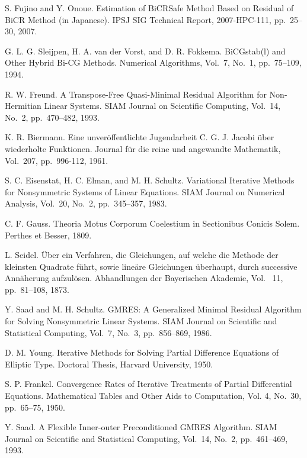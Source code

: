 \documentclass[a4paper]{jarticle}
\begin{document}
{\begin{thebibliography}{10}
S. Fujino and Y. Onoue.
\newblock Estimation of BiCRSafe Method Based on Residual of BiCR Method (in Japanese).
\newblock IPSJ SIG Technical Report, 2007-HPC-111, pp.\ 25--30, 2007.

G. L. G. Sleijpen, H. A. van der Vorst, and D. R. Fokkema.
\newblock BiCGstab(l) and Other Hybrid Bi-CG Methods.
\newblock Numerical Algorithms, Vol.~7, No.~1, pp.\ 75--109, 1994.

R. W. Freund.
\newblock A Transpose-Free Quasi-Minimal Residual Algorithm for
	Non-Hermitian Linear Systems.
\newblock SIAM Journal on Scientific Computing, Vol.~14, No.~2, pp.\ 470--482, 1993.

K. R. Biermann.
\newblock Eine unver\"offentlichte Jugendarbeit C. G. J. Jacobi \"uber
	wiederholte Funktionen.
\newblock Journal f\"ur die reine und angewandte Mathematik, Vol.~207, pp.\ 996-112, 1961.

S. C. Eisenstat, H. C. Elman, and M. H. Schultz.
\newblock Variational Iterative Methods for Nonsymmetric Systems of
	Linear Equations.
\newblock SIAM Journal on Numerical Analysis, Vol.~20, No.~2, pp.\ 345--357, 1983.

C. F. Gauss.
\newblock Theoria Motus Corporum Coelestium in Sectionibus Conicis Solem. 
\newblock Perthes et Besser, 1809.

L. Seidel.
\newblock \"Uber ein Verfahren, die Gleichungen, auf welche die Methode
	der kleinsten Quadrate f\"uhrt, sowie line\"are Gleichungen
	\"uberhaupt, durch successive Ann\"aherung  aufzul\"osen.
\newblock Abhandlungen der Bayerischen Akademie, Vol. ~11, pp.\ 81--108,
	1873.

Y. Saad and M. H. Schultz.
\newblock GMRES: A Generalized Minimal Residual Algorithm for Solving
	Nonsymmetric Linear Systems.
\newblock SIAM Journal on Scientific and Statistical Computing, Vol.~7, No.~3, pp.\ 856--869, 1986.

D. M. Young.
\newblock Iterative Methods for Solving Partial Difference Equations of
	Elliptic Type.
\newblock Doctoral Thesis, Harvard University, 1950.

S. P. Frankel.
\newblock Convergence Rates of Iterative Treatments of Partial
	Differential Equations.
\newblock Mathematical Tables and Other Aids to Computation, Vol. 4, No.~30, 
	pp.\ 65--75, 1950.

Y. Saad.
\newblock A Flexible Inner-outer Preconditioned GMRES Algorithm.
\newblock SIAM Journal on Scientific and Statistical Computing, Vol.~14, No.~2, pp.\ 461--469, 1993.


\end{thebibliography}}
\end{document}
